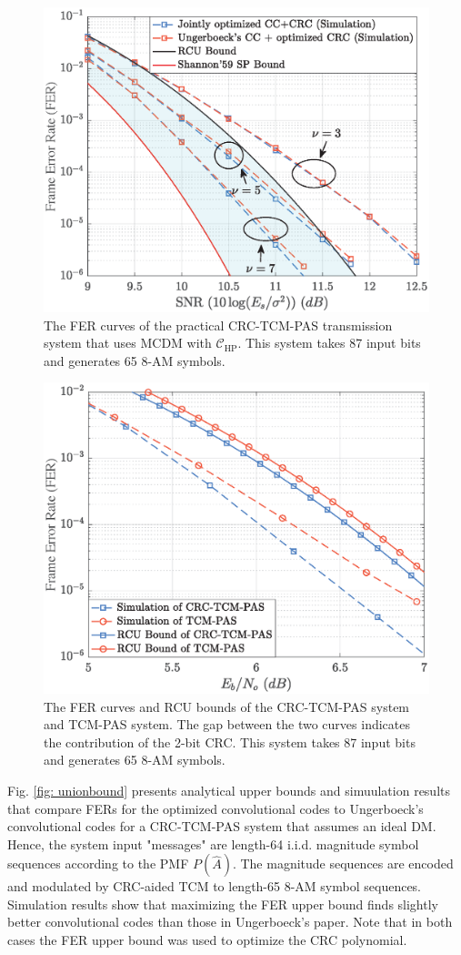 \documentclass [PhD] {uclathes}
\begin{document}
\begin{figure}[t] 
    \centering
      \includegraphics[width=0.6\linewidth]{figures/Figure_2_Simulation.eps}
      \caption{The FER curves of the practical  CRC-TCM-PAS transmission system that uses MCDM with $\mathcal{C}_{\mathrm{HP}}$. This system takes 87 input bits and generates 65 8-AM symbols. }
      \label{fig: fer_1}
\end{figure}

\begin{figure}[t] 
    \centering
      \includegraphics[width=0.6\linewidth]{figures/remove_CRC.eps}
      \caption{The FER curves and RCU bounds of the CRC-TCM-PAS system and TCM-PAS system. The gap between the two curves indicates the contribution of the 2-bit CRC. This system takes 87 input bits and generates 65 8-AM symbols. }
      \label{fig: remove_crc}
\end{figure}

Fig. \ref{fig: unionbound} presents analytical upper bounds and simuulation results that compare FERs for the optimized convolutional codes to  Ungerboeck's convolutional codes for a CRC-TCM-PAS system that assumes an ideal DM.  Hence, the system input "messages" are length-64 i.i.d. magnitude symbol sequences according to the PMF $P(\hat{A})$. The magnitude sequences are encoded and modulated by CRC-aided TCM to length-65 8-AM symbol sequences. Simulation results show that maximizing the FER upper bound finds slightly better convolutional codes  than those in Ungerboeck's paper.  Note that in both cases the FER upper bound was used to optimize the CRC polynomial.
\end{document}
